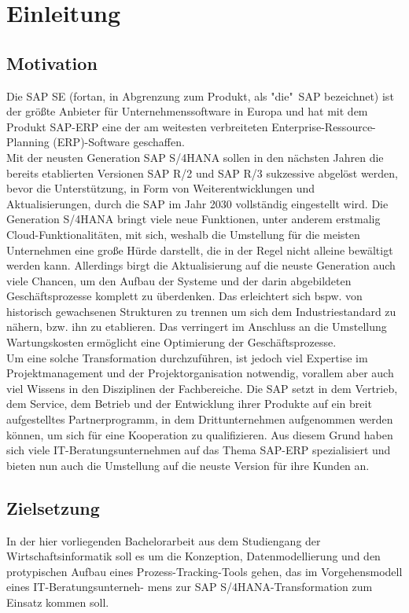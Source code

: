 \section{Einleitung}
\subsection{Motivation}
Die SAP SE (fortan, in Abgrenzung zum Produkt, als "die"\ SAP bezeichnet) ist der größte Anbieter für Unternehmenssoftware in Europa und hat mit dem Produkt SAP-ERP eine der am weitesten verbreiteten Enterprise-Ressource-Planning (ERP)-Software geschaffen. \\Mit der neusten Generation SAP S/4HANA sollen in den nächsten Jahren die bereits etablierten Versionen SAP R/2 und SAP R/3 sukzessive abgelöst werden, bevor die Unterstützung, in Form von Weiterentwicklungen und Aktualisierungen, durch die SAP im Jahr 2030 vollständig eingestellt wird. Die Generation S/4HANA bringt viele neue Funktionen, unter anderem erstmalig Cloud-Funktionalitäten, mit sich, weshalb die Umstellung für die meisten Unternehmen eine große Hürde darstellt, die in der Regel nicht alleine bewältigt werden kann. Allerdings birgt die Aktualisierung auf die neuste Generation auch viele Chancen, um den Aufbau der Systeme und der darin abgebildeten Geschäftsprozesse komplett zu überdenken. Das erleichtert sich bspw. von historisch gewachsenen Strukturen zu trennen um sich dem Industriestandard zu nähern, bzw. ihn zu etablieren. Das verringert im Anschluss an die Umstellung Wartungskosten ermöglicht eine Optimierung der Geschäftsprozesse.\\ Um eine solche Transformation durchzuführen, ist jedoch viel Expertise im Projektmanagement und der Projektorganisation notwendig, vorallem aber auch viel Wissens in den Disziplinen der Fachbereiche.
Die SAP setzt in dem Vertrieb, dem Service, dem Betrieb und der Entwicklung ihrer Produkte auf ein breit aufgestelltes Partnerprogramm, in dem Drittunternehmen aufgenommen werden können, um sich für eine Kooperation zu qualifizieren. Aus diesem Grund haben sich viele IT-Beratungsunternehmen auf das Thema SAP-ERP spezialisiert und bieten nun auch die Umstellung auf die neuste Version für ihre Kunden an.

\subsection{Zielsetzung}
In der hier vorliegenden Bachelorarbeit aus dem Studiengang der Wirtschaftsinformatik soll es um die Konzeption, Datenmodellierung und den protypischen Aufbau eines Prozess-Tracking-Tools gehen, das im Vorgehensmodell eines IT-Beratungsunterneh- mens zur SAP S/4HANA-Transformation zum Einsatz kommen soll.\\ 

